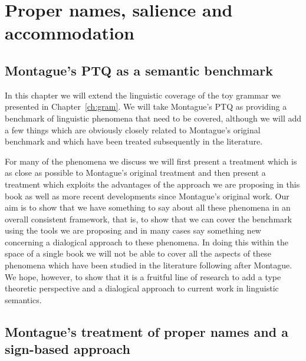 \chapter{Proper names, salience and accommodation}
\label{ch:propnames}
\setcounter{examplectr}{0}

\section{Montague's PTQ as a semantic benchmark}

In this chapter we will extend the linguistic coverage of the toy
grammar we presented in Chapter~\ref{ch:gram}.  We will take
Montague's PTQ \citep{Montague1973,Montague1974} as providing a benchmark of linguistic phenomena that
need to be covered, although we will add a few things which are
obviously closely related to Montague's original benchmark and which
have been treated subsequently in the literature.

For many of the phenomena we discuss we will first present a treatment
which is as close as possible to Montague's original treatment and
then present a treatment which exploits the advantages of the approach
we are proposing in this book as well as more recent developments
since Montague's original work.  Our aim is to show that we have
something to say about all these phenomena in an overall consistent
framework, that is, to show that we can cover the benchmark using the
tools we are proposing and in many cases say something new concerning
a dialogical approach to these phenomena.  In doing this within the
space of a single book we will not be able to cover all the aspects of
these phenomena which have been studied in the literature following
after Montague.  We hope, however, to show that it is a fruitful line
of research to add a type theoretic perspective and a dialogical
approach to current work in linguistic semantics.   
 



\section{Montague's treatment of proper names and a sign-based approach}

